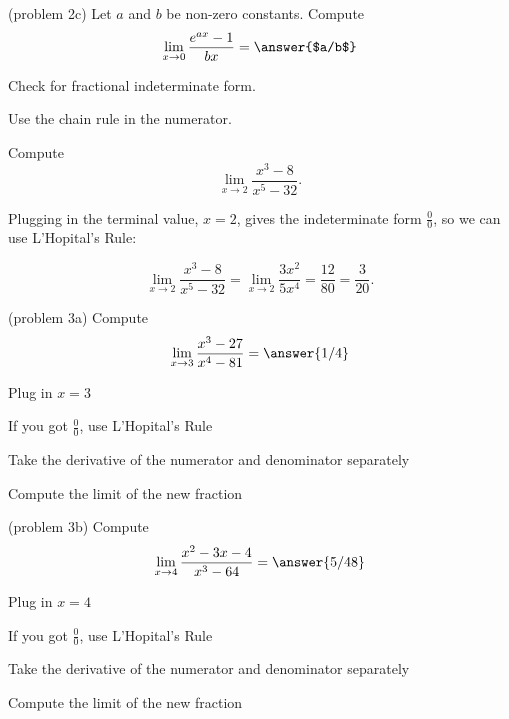 \documentclass[handout]{ximera}
\begin{document}
\begin{problem}(problem 2c)
 Let $a$ and $b$ be non-zero constants. Compute
  \[
  \lim_{x \to 0} \frac{e^{ax} - 1}{bx} = \answer{$a/b$}
  \]
  
    \begin{hint}
      Check for fractional indeterminate form.
    \end{hint}
    
	  \begin{hint}
      Use the chain rule in the numerator.
    \end{hint}
	
\end{problem}


\begin{example}[example 3]
Compute  
       \[
            \lim_{x \to 2} \frac{x^3 - 8}{x^5 - 32}.
        \]
            
Plugging in the terminal value, $x=2$, gives 
the indeterminate form $\frac00$, so we can use L'Hopital's Rule:
 
\[\lim_{x \to 2} \frac{x^3 - 8}{x^5 - 32} = \lim_{x \to 2} \frac{3x^2}{5x^4} = \frac{12}{80} = \frac{3}{20}.\]
\end{example}

\begin{problem}(problem 3a)
  Compute
  \[
  \lim_{x \to 3} \frac{x^3 - 27}{x^4 - 81} = \answer{1/4}
  \]
  
    \begin{hint}
      Plug in $x=3$
    \end{hint}
    \begin{hint}
      If you got $\frac00$, use L'Hopital's Rule
    \end{hint}
    \begin{hint}
      Take the derivative of the numerator and denominator separately
    \end{hint}
	  \begin{hint}
      Compute the limit of the new fraction
    \end{hint}
  
\end{problem}


\begin{problem}(problem 3b)
  Compute
  \[
  \lim_{x \to 4} \frac{x^2 - 3x - 4}{x^3 - 64} = \answer{5/48}
  \]
  
    \begin{hint}
      Plug in $x=4$
    \end{hint}
    \begin{hint}
      If you got $\frac00$, use L'Hopital's Rule
    \end{hint}
    \begin{hint}
      Take the derivative of the numerator and denominator separately
    \end{hint}
	  \begin{hint}
      Compute the limit of the new fraction
    \end{hint}
  
\end{problem}
\end{document}
